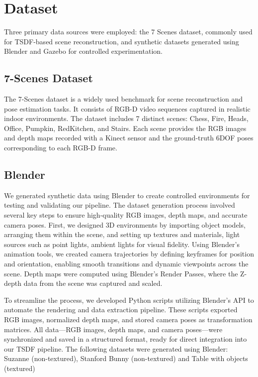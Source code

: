\documentclass[conference]{IEEEtran}
\begin{document}
\section{Dataset}
Three primary data sources were employed: the 7 Scenes dataset, commonly used for TSDF-based scene reconstruction, and synthetic datasets generated using Blender and Gazebo for controlled experimentation.

\subsection{7-Scenes Dataset}
The 7-Scenes dataset is a widely used benchmark for scene reconstruction and pose estimation tasks. It consists of RGB-D video sequences captured in realistic indoor environments. The dataset includes 7 distinct scenes: Chess, Fire, Heads, Office, Pumpkin, RedKitchen, and Stairs. Each scene provides the RGB images and depth maps recorded with a Kinect sensor and the ground-truth 6DOF poses corresponding to each RGB-D frame. 

\subsection{Blender}
We generated synthetic data using Blender to create controlled environments for testing and validating our pipeline. The dataset generation process involved several key steps to ensure high-quality RGB images, depth maps, and accurate camera poses. First, we designed 3D environments by importing object models, arranging them within the scene, and setting up textures and materials, light sources such as point lights, ambient lights for visual fidelity. Using Blender's animation tools, we created camera trajectories by defining keyframes for position and orientation, enabling smooth transitions and dynamic viewpoints across the scene. Depth maps were computed using Blender’s Render Passes, where the Z-depth data from the scene was captured and scaled.

To streamline the process, we developed Python scripts utilizing Blender’s API to automate the rendering and data extraction pipeline. These scripts exported RGB images, normalized depth maps, and stored camera poses as transformation matrices. All data—RGB images, depth maps, and camera poses—were synchronized and saved in a structured format, ready for direct integration into our TSDF pipeline. The following datasets were generated using Blender: Suzanne (non-textured), Stanford Bunny (non-textured) and Table with objects (textured)
\end{document}
